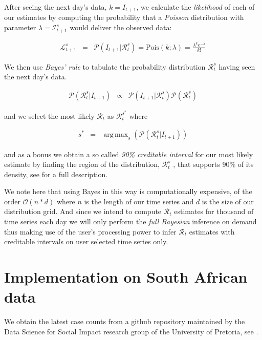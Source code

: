 \documentclass[11pt]{article}
\DeclareMathOperator*{\argmax}{arg\,max}
\begin{document}
After seeing the next day's data,  $k = I_{t+1}$, we calculate the {\em likelihood} of each of our estimates by computing
the probability that a {\em Poisson} distribution with parameter $\lambda = \mathcal{I}_{t+1}^s$
would deliver the observed data:

\begin{eqnarray}
\mathcal{L}_{t+1}^s & =  & \mathcal{P}(I_{t+1} | \mathcal{R}_t^s ) =  \text{Pois}(k;  \lambda)  = \frac{\lambda^k e^{-\lambda}}{k!} \label{eq9} 
\end{eqnarray}

We then use {\em Bayes' rule} to tabulate the probability distribution $\mathcal{R}_t^s$ having seen the next day's data.

\begin{eqnarray}
\mathcal{P}(\mathcal{R}_t^s | I_{t+1} ) & \propto  & \mathcal{P}(I_{t+1} | \mathcal{R}_t^s )  \mathcal{P}(\mathcal{R}_t^s  )  \label{eq10} 
\end{eqnarray}

and we select the most likely $\mathcal{R}_t$ as $\mathcal{R}_t^{s^*}$ where

\begin{eqnarray}
s^* & = & \argmax_s ( \mathcal{P}(\mathcal{R}_t^s | I_{t+1} ) )  \label{eq11} 
\end{eqnarray}
 
 and as a bonus we obtain a so called {\em 90\% creditable interval} for our most likely estimate by
 finding the region of the distribution, $\mathcal{R}_t^s$ , that supports 90\% of its density, see \cite{easystats}
 for a full description.
 
 We note here that using Bayes in this way is computationally expensive, of the order $\mathcal{O}(n * d)$
 where $n$ is the length of our time series and $d$ is the size of our distribution grid. And since we intend
 to compute $\mathcal{R}_t$ estimates for thousand of time series each day we will only perform the 
 {\em full Bayesian} inference on demand thus making use of the user's processing power to infer $\mathcal{R}_t$
 estimates with creditable intervals on user selected time series only.
 
\section{Implementation on South African data}

We obtain the latest case counts from a github repository maintained by the Data Science for Social Impact research group
of the University of Pretoria, see \cite{dsfsi}.
\end{document}
